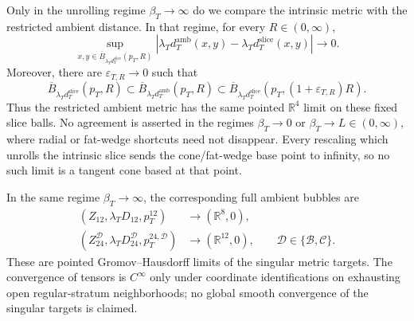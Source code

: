 \begin{theorem}
Only in the unrolling regime \(\beta_T\to\infty\) do we compare the
intrinsic metric with the restricted ambient distance.  In that regime, for
every \(R\in(0,\infty)\),
\begin{equation}
 \sup_{x,y\in
  \overline B_{\lambda_Td_T^{\mathrm{slice}}}(p_T,R)}
 \left|
  \lambda_Td_T^{\mathrm{amb}}(x,y)
  -\lambda_Td_T^{\mathrm{slice}}(x,y)
 \right|\longrightarrow0.
 \label{wb:sphere-metric-intrinsic-ambient-agreement}
\end{equation}
Moreover, there are \(\varepsilon_{T,R}\to0\) such that
\begin{equation}
 \overline B_{\lambda_Td_T^{\mathrm{slice}}}(p_T,R)
 \subset
 \overline B_{\lambda_Td_T^{\mathrm{amb}}}(p_T,R)
 \subset
 \overline B_{\lambda_Td_T^{\mathrm{slice}}}
             (p_T,(1+\varepsilon_{T,R})R).
 \label{wb:sphere-metric-intrinsic-ambient-ball-comparison}
\end{equation}
Thus the restricted ambient metric has the same pointed
\(\mathbb R^4\) limit on these fixed slice balls.  No agreement is asserted
in the regimes \(\beta_T\to0\) or \(\beta_T\to L\in(0,\infty)\), where
radial or fat-wedge shortcuts need not disappear.  Every rescaling which
unrolls the intrinsic slice sends the cone/fat-wedge base point to infinity,
so no such limit is a tangent cone based at that point.

In the same regime \(\beta_T\to\infty\), the corresponding full ambient
bubbles are
\begin{align}
 (Z_{12},\lambda_TD_{12},p_T^{12})
 &\longrightarrow(\mathbb R^8,0),\\
 (Z_{24}^{\mathcal D},\lambda_TD_{24}^{\mathcal D},
  p_T^{24,\mathcal D})
 &\longrightarrow(\mathbb R^{12},0),
 \qquad\mathcal D\in\{\mathcal B,\mathcal C\}.
 \label{wb:sphere-metric-arbitrary-unrolling-ambient-bubbles}
\end{align}
These are pointed Gromov--Hausdorff limits of the singular metric targets.
The convergence of tensors is \(C^\infty\) only under coordinate
identifications on exhausting open regular-stratum neighborhoods; no
global smooth convergence of the singular targets is claimed.
\end{theorem}

